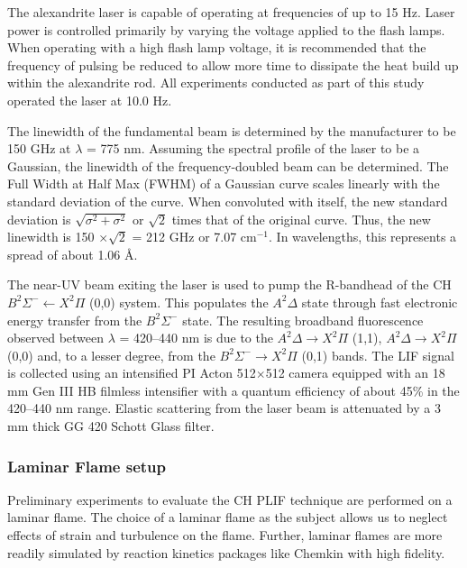 The alexandrite laser is capable of operating at frequencies of up to 15 Hz.
Laser power is controlled primarily by varying the voltage applied to the flash lamps.
When operating with a high flash lamp voltage, it is recommended that the frequency of pulsing be reduced to allow more time to dissipate the heat build up within the alexandrite rod.
All experiments conducted as part of this study operated the laser at 10.0 Hz.

The linewidth of the fundamental beam is determined by the manufacturer to be 150 GHz at \(\lambda\) = 775 nm.
Assuming the spectral profile of the laser to be a Gaussian, the linewidth of the frequency-doubled beam can be determined.
The Full Width at Half Max (FWHM) of a Gaussian curve scales linearly with the standard deviation of the curve.
When convoluted with itself, the new standard deviation is \(\sqrt{\sigma^2 + \sigma^2}\) or \(\sqrt{2}\) times that of the original curve.
Thus, the new linewidth is 150 \(\times\sqrt{2}\) = 212 GHz or 7.07 cm\(^{-1}\).
In wavelengths, this represents a spread of about 1.06 \AA.

The near-UV beam exiting the laser is used to pump the R-bandhead of the CH \(B^2\Sigma^- \leftarrow X^2\Pi\) (0,0) system.
This populates the \(A^2\Delta\) state through fast electronic energy transfer from the \(B^2\Sigma^-\) state.
The resulting broadband fluorescence observed between \(\lambda\) = 420--440 nm is due to the \(A^2\Delta \rightarrow X^2\Pi\) (1,1), \(A^2\Delta \rightarrow X^2\Pi\) (0,0) and, to a lesser degree, from the \(B^2\Sigma^- \rightarrow X^2\Pi\) (0,1) bands.
The LIF signal is collected using an intensified PI Acton 512\(\times\)512 camera equipped with an 18 mm Gen III HB filmless intensifier with a quantum efficiency of about 45\% in the 420--440 nm range.
Elastic scattering from the laser beam is attenuated by a 3 mm thick GG 420 Schott Glass filter.

\subsubsection{Laminar Flame setup}
\label{sec:laminarflamesetup}

Preliminary experiments to evaluate the CH PLIF technique are performed on a laminar flame.
The choice of a laminar flame as the subject allows us to neglect effects of strain and turbulence on the flame.
Further, laminar flames are more readily simulated by reaction kinetics packages like Chemkin with high fidelity.

